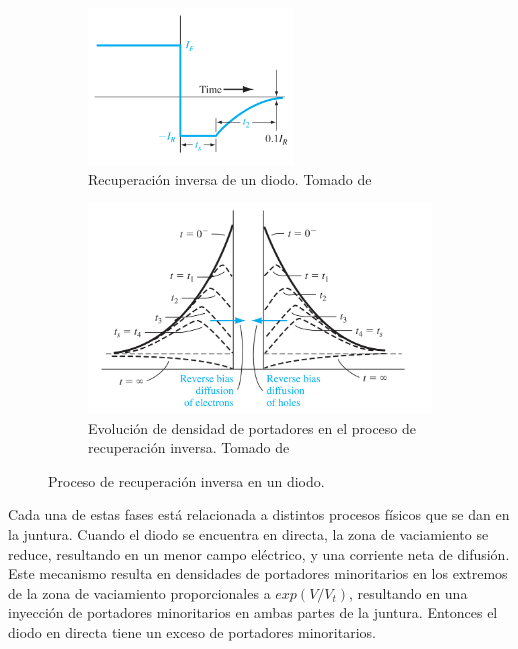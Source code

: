 \begin{figure}[t]
    \centering
    \begin{subfigure}[b]{0.45\textwidth}
        \centering
        \includegraphics[width=0.6\textwidth]{images/diode_reverse_recovery.png}
        \caption{Recuperación inversa de un diodo. Tomado de
        \cite{neamen2012semiconductor}}
        \label{fig:diode_reverse_recovery}
    \end{subfigure}
    \hfill
    \begin{subfigure}[b]{0.45\textwidth}
        \centering
        \includegraphics[width=\textwidth]{images/carrier_concentrations_turnoff.jpg}
        \caption{Evolución de densidad de portadores en el proceso de
        recuperación inversa. Tomado de \cite{neamen2012semiconductor}}
        \label{fig:carrier_concentrations_turnoff}
    \end{subfigure}
    \caption{Proceso de recuperación inversa en un diodo.}
    \label{fig:pn_reverse_recovery_plots}
\end{figure}

Cada una de estas fases está relacionada a distintos procesos físicos que se dan
en la juntura. Cuando el diodo se encuentra en directa, la zona de vaciamiento
se reduce, resultando en un menor campo eléctrico, y una corriente neta de
difusión. Este mecanismo resulta en densidades de portadores minoritarios en los
extremos de la zona de vaciamiento proporcionales a $exp(V/V_t)$, resultando en
una inyección de portadores minoritarios en ambas partes de la juntura. Entonces
el diodo en directa tiene un exceso de portadores minoritarios.
\cite{neamen2012semiconductor}

